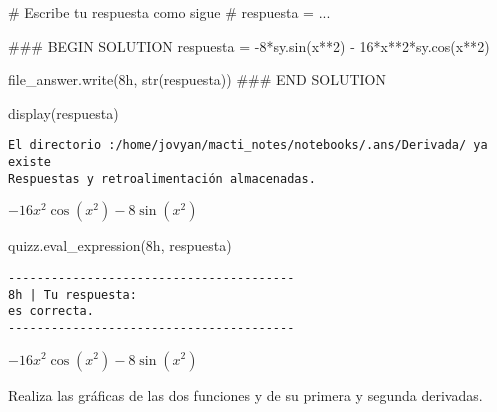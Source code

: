\documentclass[
  letterpaper,
  DIV=11,
  numbers=noendperiod]{scrreprt}
\newenvironment{Shaded}{\begin{snugshade}}{\end{snugshade}}
\newcommand{\BuiltInTok}[1]{\textcolor[rgb]{0.00,0.23,0.31}{#1}}
\newcommand{\CommentTok}[1]{\textcolor[rgb]{0.37,0.37,0.37}{#1}}
\newcommand{\DecValTok}[1]{\textcolor[rgb]{0.68,0.00,0.00}{#1}}
\newcommand{\NormalTok}[1]{\textcolor[rgb]{0.00,0.23,0.31}{#1}}
\newcommand{\OperatorTok}[1]{\textcolor[rgb]{0.37,0.37,0.37}{#1}}
\newcommand{\RegionMarkerTok}[1]{\textcolor[rgb]{0.00,0.23,0.31}{#1}}
\newcommand{\StringTok}[1]{\textcolor[rgb]{0.13,0.47,0.30}{#1}}
\begin{document}
\begin{Shaded}
\begin{Highlighting}[]
\CommentTok{\# Escribe tu respuesta como sigue }
\CommentTok{\# respuesta = ...}

\CommentTok{\#\#\# }\RegionMarkerTok{BEGIN}\CommentTok{ SOLUTION}
\NormalTok{respuesta }\OperatorTok{=} \OperatorTok{{-}}\DecValTok{8}\OperatorTok{*}\NormalTok{sy.sin(x}\OperatorTok{**}\DecValTok{2}\NormalTok{) }\OperatorTok{{-}} \DecValTok{16}\OperatorTok{*}\NormalTok{x}\OperatorTok{**}\DecValTok{2}\OperatorTok{*}\NormalTok{sy.cos(x}\OperatorTok{**}\DecValTok{2}\NormalTok{)}

\NormalTok{file\_answer.write(}\StringTok{\textquotesingle{}8h\textquotesingle{}}\NormalTok{, }\BuiltInTok{str}\NormalTok{(respuesta))}
\CommentTok{\#\#\# }\RegionMarkerTok{END}\CommentTok{ SOLUTION}

\NormalTok{display(respuesta)}
\end{Highlighting}
\end{Shaded}

\begin{verbatim}
El directorio :/home/jovyan/macti_notes/notebooks/.ans/Derivada/ ya existe
Respuestas y retroalimentación almacenadas.
\end{verbatim}

$\displaystyle - 16 x^{2} \cos{\left(x^{2} \right)} - 8 \sin{\left(x^{2} \right)}$

\begin{Shaded}
\begin{Highlighting}[]
\NormalTok{quizz.eval\_expression(}\StringTok{\textquotesingle{}8h\textquotesingle{}}\NormalTok{, respuesta)}
\end{Highlighting}
\end{Shaded}

\begin{verbatim}
----------------------------------------
8h | Tu respuesta:
es correcta.
----------------------------------------
\end{verbatim}

$\displaystyle - 16 x^{2} \cos{\left(x^{2} \right)} - 8 \sin{\left(x^{2} \right)}$

Realiza las gráficas de las dos funciones y de su primera y segunda
derivadas.
\end{document}
